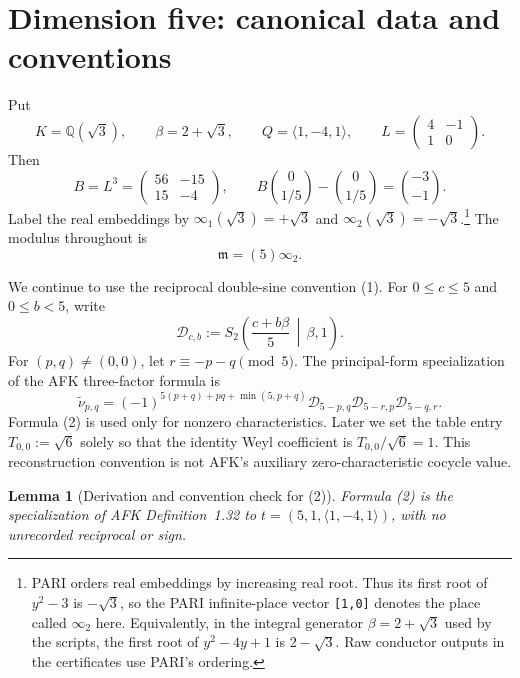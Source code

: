\documentclass[11pt]{article}
\newtheorem{lemma}[theorem]{Lemma}
\newcommand{\Q}{\mathbb Q}
\begin{document}
\section{Dimension five: canonical data and conventions}

Put
\[
 K=\Q(\sqrt3),\qquad \beta=2+\sqrt3,\qquad
 Q=\langle1,-4,1\rangle,\qquad
 L=\begin{pmatrix}4&-1\\1&0\end{pmatrix}.
\]
Then
\[
 B=L^3=\begin{pmatrix}56&-15\\15&-4\end{pmatrix},\qquad
 B\binom0{1/5}-\binom0{1/5}=\binom{-3}{-1}.
\]
Label the real embeddings by
$\infty_1(\sqrt3)=+\sqrt3$ and
$\infty_2(\sqrt3)=-\sqrt3$.\footnote{PARI orders real embeddings by
increasing real root.  Thus its first root of $y^2-3$ is $-\sqrt3$,
so the PARI infinite-place vector \texttt{[1,0]} denotes the place
called $\infty_2$ here.  Equivalently, in the integral generator
$\beta=2+\sqrt3$ used by the scripts, the first root of
$y^2-4y+1$ is $2-\sqrt3$.  Raw conductor outputs in the certificates
use PARI's ordering.}  The modulus throughout is
\[
 \mathfrak m=(5)\infty_2.
\]

We continue to use the reciprocal double-sine convention (1).
For $0\le c\le5$ and $0\le b<5$, write
\[
 \mathcal D_{c,b}:=
 S_2\!\left(\frac{c+b\beta}{5}\,\middle|\,\beta,1\right).
\]
For $(p,q)\ne(0,0)$, let $r\equiv-p-q\pmod5$.  The principal-form
specialization of the AFK three-factor formula is
\[
 \widetilde\nu_{p,q}
 =(-1)^{5(p+q)+pq+\min(5,p+q)}
 \mathcal D_{5-p,q}\mathcal D_{5-r,p}\mathcal D_{5-q,r}.
\tag{2}
\]
Formula (2) is used only for nonzero characteristics.  Later we set the
table entry $T_{0,0}:=\sqrt6$ solely so that the identity Weyl
coefficient is $T_{0,0}/\sqrt6=1$.  This reconstruction convention is
not AFK's auxiliary zero-characteristic cocycle value.

\begin{lemma}[Derivation and convention check for (2)]
Formula \textup{(2)} is the specialization of AFK Definition~1.32 to
$t=(5,1,\langle1,-4,1\rangle)$, with no unrecorded reciprocal or sign.
\end{lemma}
\end{document}
